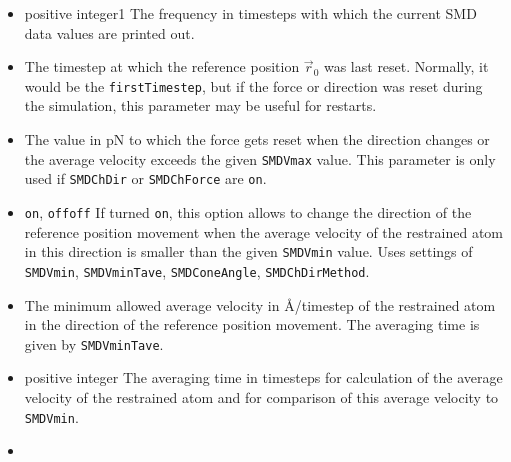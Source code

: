 \begin{itemize}
\item
{}
{positive integer}{1} {The frequency in timesteps with which the
current SMD data values are printed out.}

\item
{}
{The timestep at which the reference position $\vec r_0$ was last
reset. Normally, it would be the {\tt firstTimestep}, but if the
force or direction was reset during the simulation, this parameter may
be useful for restarts.}

\item
{} {The value in pN to which the force gets reset when the
direction changes or the average velocity exceeds the given
{\tt SMDVmax} value. This parameter is only used if {\tt SMDChDir}
or {\tt SMDChForce} are
{\tt on}.}

\item
{}
{{\tt on}, {\tt off}}{{\tt off}}
{If turned {\tt on}, this option allows to change the direction of
the reference position movement when the average velocity of the
restrained atom in this direction is smaller than the given
{\tt SMDVmin} value. Uses settings of 
{\tt SMDVmin}, {\tt SMDVminTave}, {\tt SMDConeAngle},
{\tt SMDChDirMethod}.}

\item
{} {The minimum allowed average velocity in
\AA/timestep of the restrained atom in the direction of the reference
position movement. The averaging time is given by {\tt SMDVminTave}.}

\item
{}
{positive integer} {The averaging time in timesteps for calculation of
the average velocity of the restrained atom and for comparison of this
average velocity to
{\tt SMDVmin}.}

\item
{}


\end{itemize}
